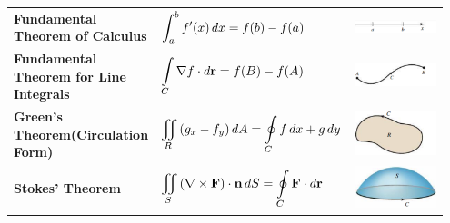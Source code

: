 \documentclass[mathNotesPreamble]{subfiles}
\begin{document}
  \begin{center}
    \renewcommand{\arraystretch}{3}
    \begin{tabular}{@{}m{0.32\linewidth}m{0.4\linewidth}m{0.23\linewidth}@{}}\toprule
      \textbf{Fundamental Theorem of Calculus}& $\displaystyle\int_a^b f'(x)\,dx=f(b)-f(a)$& \includegraphics[width=\linewidth]{images/briggs_17_08/tab17_04a}\\
      \textbf{Fundamental Theorem for Line Integrals}& $\displaystyle\int\limits_C \nabla f\cdot d{\mathbf{r}}=f(B)-f(A)$& \includegraphics[width=\linewidth]{images/briggs_17_08/tab17_04b}\\
      \textbf{Green's Theorem\newline (Circulation Form)}& $\displaystyle\iint\limits_R {\left(g_x-f_y\right)}\,dA=\oint\limits_C f\,dx+g\,dy$& \includegraphics[width=\linewidth]{images/briggs_17_08/tab17_04c}\\
      \textbf{Stokes' Theorem}& $\displaystyle\iint\limits_S {\left(\nabla\times\mathbf F\right)}\cdot{\mathbf{n}}\,dS=\oint\limits_C \mathbf F\cdot d{\mathbf{r}}$& \includegraphics[width=\linewidth]{images/briggs_17_08/tab17_04d}\\

\end{tabular}
\end{center}
\end{document}
